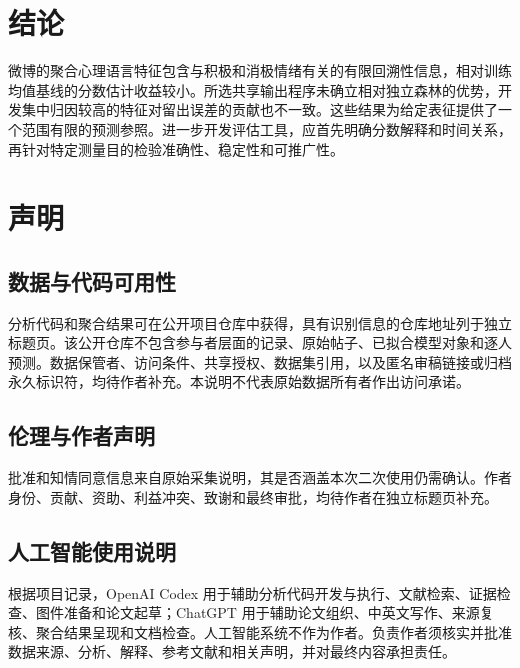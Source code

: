 \section{结论}
微博的聚合心理语言特征包含与积极和消极情绪有关的有限回溯性信息，相对训练均值基线的分数估计收益较小。所选共享输出程序未确立相对独立森林的优势，开发集中归因较高的特征对留出误差的贡献也不一致。这些结果为给定表征提供了一个范围有限的预测参照。进一步开发评估工具，应首先明确分数解释和时间关系，再针对特定测量目的检验准确性、稳定性和可推广性。

\section{声明}
\subsection{数据与代码可用性}
分析代码和聚合结果可在公开项目仓库中获得，具有识别信息的仓库地址列于独立标题页。该公开仓库不包含参与者层面的记录、原始帖子、已拟合模型对象和逐人预测。数据保管者、访问条件、共享授权、数据集引用，以及匿名审稿链接或归档永久标识符，均待作者补充。本说明不代表原始数据所有者作出访问承诺。

\subsection{伦理与作者声明}
批准和知情同意信息来自原始采集说明，其是否涵盖本次二次使用仍需确认。作者身份、贡献、资助、利益冲突、致谢和最终审批，均待作者在独立标题页补充。

\subsection{人工智能使用说明}
根据项目记录，OpenAI Codex 用于辅助分析代码开发与执行、文献检索、证据检查、图件准备和论文起草；ChatGPT 用于辅助论文组织、中英文写作、来源复核、聚合结果呈现和文档检查。人工智能系统不作为作者。负责作者须核实并批准数据来源、分析、解释、参考文献和相关声明，并对最终内容承担责任。

\FloatBarrier


